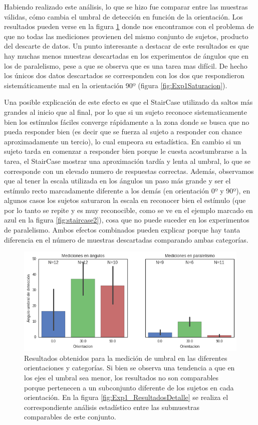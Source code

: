 \documentclass{article}
\numberwithin{figure}{section}
\begin{document}
    Habiendo realizado este análisis, lo que se hizo fue comparar entre las muestras válidas, cómo cambia el umbral de detección en función de la orientación. Los resultados pueden verse en la figura \ref{fig:Exp1Resultados} donde nos encontramos con el problema de que no todas las mediciones provienen del mismo conjunto de sujetos, producto del descarte de datos. Un punto interesante a destacar de este resultados es que hay muchas menos muestras descartadas en los experimentos de ángulos que en los de paralelismo, pese a que se observa que es una tarea mas difícil. De hecho los únicos dos datos descartados se corresponden con los dos que respondieron sistemáticamente mal en la orientación 90º (figura \ref{fig:Exp1Saturacion}). 
    
    Una posible explicación de este efecto es que el StairCase utilizado da saltos más grandes al inicio que al final, por lo que si un sujeto reconoce sistematicamente bien los estímulos fáciles converge rápidamente a la zona donde se busca que no pueda responder bien (es decir que se fuerza al sujeto a responder con chance aproximadamente un tercio), lo cual empeora su estadística. En cambio si un sujeto tarda en comenzar a responder bien porque le cuesta acostumbrarse a la tarea, el StairCase mostrar una aproximación tardía y lenta al umbral, lo que se corresponde con un elevado numero de respuestas correctas. Además, observamos que al tener la escala utilizada en los ángulos un paso más grande y ser el estímulo recto marcadamente diferente a los demás (en orientación 0º y 90º), en algunos casos los sujetos saturaron la escala en reconocer bien el estímulo (que por lo tanto se repite y es muy reconocible, como se ve en el ejemplo marcado en azul en la figura \ref{fig:staircase2}), cosa que no puede suceder en los experimentos de paralelismo. Ambos efectos combinados pueden explicar porque hay tanta diferencia en el número de muestras descartadas comparando ambas categorías. 
    
    \begin{figure}
        \center
        \includegraphics[width=\textwidth]{Imagenes/Exp1_Resultados.png}
        \caption{Resultados obtenidos para la medición de umbral en las diferentes orientaciones y categorías. Si bien se observa una tendencia a que en los ejes el umbral sea menor, los resultados no son comparables porque pertenecen a un subconjunto diferente de los sujetos en cada orientación. En la figura \ref{fig:Exp1_ResultadosDetalle} se realiza el correspondiente análisis estadístico entre las submuestras comparables de este conjunto.}
        \label{fig:Exp1Resultados}
    \end{figure}  
	
\end{document}
